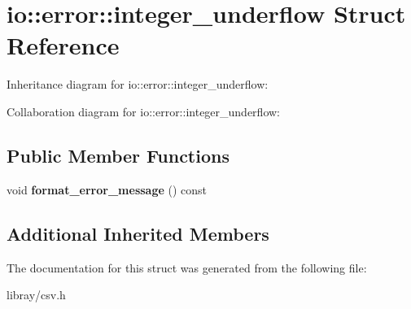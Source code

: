\hypertarget{structio_1_1error_1_1integer__underflow}{}\section{io\+:\+:error\+:\+:integer\+\_\+underflow Struct Reference}
\label{structio_1_1error_1_1integer__underflow}


Inheritance diagram for io\+:\+:error\+:\+:integer\+\_\+underflow\+:


Collaboration diagram for io\+:\+:error\+:\+:integer\+\_\+underflow\+:
\subsection*{Public Member Functions}
\begin{DoxyCompactItemize}
\item 
\mbox{\label{structio_1_1error_1_1integer__underflow_a2ded9c7e982403877055514543207847}} 
void {\bfseries format\+\_\+error\+\_\+message} () const
\end{DoxyCompactItemize}
\subsection*{Additional Inherited Members}


The documentation for this struct was generated from the following file\+:\begin{DoxyCompactItemize}
\item 
libray/csv.\+h\end{DoxyCompactItemize}
